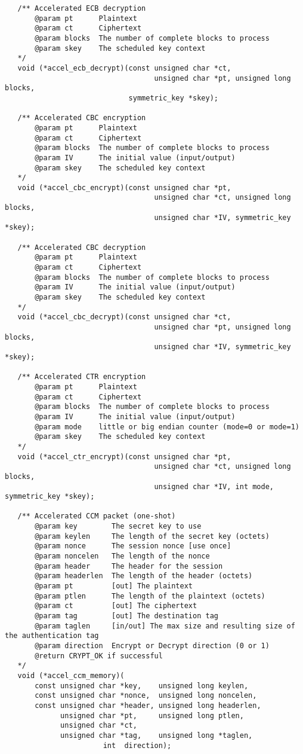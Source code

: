 \documentclass[a4paper]{book}
\begin{document}
\begin{small}
\begin{verbatim}
   /** Accelerated ECB decryption 
       @param pt      Plaintext
       @param ct      Ciphertext
       @param blocks  The number of complete blocks to process
       @param skey    The scheduled key context
   */
   void (*accel_ecb_decrypt)(const unsigned char *ct, 
                                   unsigned char *pt, unsigned long blocks, 
                             symmetric_key *skey);

   /** Accelerated CBC encryption 
       @param pt      Plaintext
       @param ct      Ciphertext
       @param blocks  The number of complete blocks to process
       @param IV      The initial value (input/output)
       @param skey    The scheduled key context
   */
   void (*accel_cbc_encrypt)(const unsigned char *pt, 
                                   unsigned char *ct, unsigned long blocks, 
                                   unsigned char *IV, symmetric_key *skey);

   /** Accelerated CBC decryption 
       @param pt      Plaintext
       @param ct      Ciphertext
       @param blocks  The number of complete blocks to process
       @param IV      The initial value (input/output)
       @param skey    The scheduled key context
   */
   void (*accel_cbc_decrypt)(const unsigned char *ct, 
                                   unsigned char *pt, unsigned long blocks, 
                                   unsigned char *IV, symmetric_key *skey);

   /** Accelerated CTR encryption 
       @param pt      Plaintext
       @param ct      Ciphertext
       @param blocks  The number of complete blocks to process
       @param IV      The initial value (input/output)
       @param mode    little or big endian counter (mode=0 or mode=1)
       @param skey    The scheduled key context
   */
   void (*accel_ctr_encrypt)(const unsigned char *pt, 
                                   unsigned char *ct, unsigned long blocks, 
                                   unsigned char *IV, int mode, symmetric_key *skey);

   /** Accelerated CCM packet (one-shot)
       @param key        The secret key to use
       @param keylen     The length of the secret key (octets)
       @param nonce      The session nonce [use once]
       @param noncelen   The length of the nonce
       @param header     The header for the session
       @param headerlen  The length of the header (octets)
       @param pt         [out] The plaintext
       @param ptlen      The length of the plaintext (octets)
       @param ct         [out] The ciphertext
       @param tag        [out] The destination tag
       @param taglen     [in/out] The max size and resulting size of the authentication tag
       @param direction  Encrypt or Decrypt direction (0 or 1)
       @return CRYPT_OK if successful
   */
   void (*accel_ccm_memory)(
       const unsigned char *key,    unsigned long keylen,
       const unsigned char *nonce,  unsigned long noncelen,
       const unsigned char *header, unsigned long headerlen,
             unsigned char *pt,     unsigned long ptlen,
             unsigned char *ct,
             unsigned char *tag,    unsigned long *taglen,
                       int  direction);


\end{verbatim}
\end{small}
\end{document}
